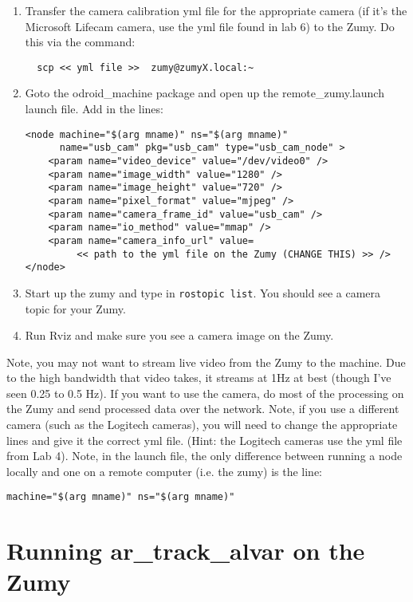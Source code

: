 \documentclass[10pt]{article}
\begin{document}
\begin{enumerate}
  \item Transfer the camera calibration yml file for the appropriate camera (if it's the Microsoft Lifecam camera, use the yml file found in lab 6) to the Zumy.  Do this via the command: 
  \begin{verbatim}
  scp << yml file >>  zumy@zumyX.local:~
  \end{verbatim}
  \item Goto the odroid\_machine package and open up the remote\_zumy.launch launch file.  Add in the lines:
  \begin{verbatim}
<node machine="$(arg mname)" ns="$(arg mname)"
      name="usb_cam" pkg="usb_cam" type="usb_cam_node" >
    <param name="video_device" value="/dev/video0" />
    <param name="image_width" value="1280" />
    <param name="image_height" value="720" />
    <param name="pixel_format" value="mjpeg" />
    <param name="camera_frame_id" value="usb_cam" />
    <param name="io_method" value="mmap" />
    <param name="camera_info_url" value=
         << path to the yml file on the Zumy (CHANGE THIS) >> />
</node>
  \end{verbatim}
  \item Start up the zumy and type in \verb=rostopic list=.  You should see a camera topic for your Zumy.
  \item Run Rviz and make sure you see a camera image on the Zumy.
\end{enumerate}

Note, you may not want to stream live video from the Zumy to the machine.  Due to the high bandwidth that video takes, it streams at 1Hz at best (though I've seen 0.25 to 0.5 Hz).  If you want to use the camera, do most of the processing on the Zumy and send processed data over the network. 
Note, if you use a different camera (such as the Logitech cameras), you will need to change the appropriate lines and give it the correct yml file.  (Hint: the Logitech cameras use the yml file from Lab 4).
Note, in the launch file, the only difference between running a node locally and one on a remote computer (i.e. the zumy) is the line: 
\begin{verbatim}
machine="$(arg mname)" ns="$(arg mname)"
\end{verbatim}

\section{Running ar\_track\_alvar on the Zumy}\label{sec:artrack}
\end{document}
